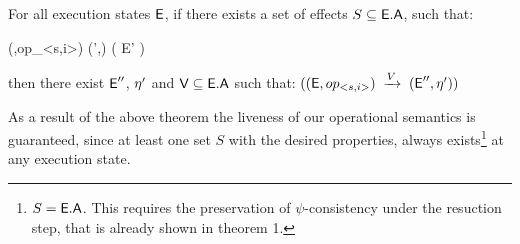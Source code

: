 %
%

\begin{theorem}
\label{theorem:three}
For all execution states ${\normalfont \textsf{E}}$, if there exists a set of effects
$S\subseteq {\normalfont \textsf{E}}.{\normalfont \textsf{A}}$, such that: 
\begin{fmathpar}
 {(\E,op_{<s,i>})} {} {(\E',\eff)} \spc \wedge \spc ( \psi {} E' )  
\end{fmathpar}
then there exist  ${\normalfont \textsf{E}}''$, $\eta'$ and ${\normalfont \textsf{V}}\subseteq {\normalfont \textsf{E}}.{\normalfont \textsf{A}}$ such that:
$(({\normalfont \textsf{E}},op_{<s,i>})\;\xrightarrow{V}\;({\normalfont \textsf{E}}'',\eta'))$
\end{theorem}
As a result of the above theorem the liveness of our operational
semantics is guaranteed, since at least one set $S$ with the desired
properties, always exists\footnote{$S={\normalfont \textsf{E}}.{\normalfont \textsf{A}}$. This requires the
preservation of $\psi$-consistency under the resuction step, that is
already shown in theorem 1.} at any execution state. 



